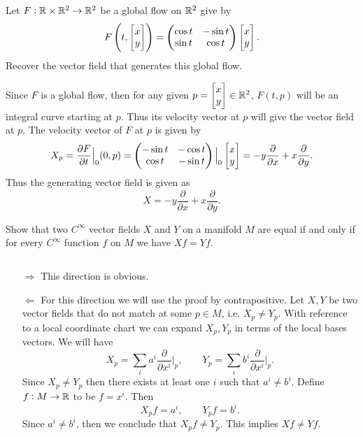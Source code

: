 \begin{problem}
	Let $ F: \mathbb{R}\times \mathbb{R}^2 \to \mathbb{R}^2 $ be a global flow on $ \mathbb{R}^2 $ give by
	\[ F\left( t, \begin{bmatrix} x \\ y \end{bmatrix} \right) = \begin{pmatrix} \cos t & -\sin t \\ \sin t & \cos t \end{pmatrix} \begin{bmatrix} x \\ y \end{bmatrix}. \]
	Recover the vector field that generates this global flow.
\end{problem}
\begin{solution}
	Since $ F $ is a global flow, then for any given $ p = \begin{bmatrix} x \\ y \end{bmatrix} \in \mathbb{R}^2 $, $ F(t,p) $ will be an integral curve starting at $ p $. Thus its velocity vector at $ p $ will give the vector field at $ p $. The velocity vector of $ F $ at $ p $ is given by
	\[ X_p = \frac{\partial F }{\partial t}\big|_{0}(0,p) = \begin{pmatrix} -\sin t & -\cos t \\ \cos t & -\sin t \end{pmatrix}\big|_{0} \begin{bmatrix} x \\ y \end{bmatrix} = -y\frac{\partial }{\partial x} + x \frac{\partial }{\partial y}. \]
	Thus the generating vector field is given as
	\[ X = -y \frac{\partial }{\partial x } + x \frac{\partial }{\partial y}. \]
\end{solution}

\begin{problem}
	Show that two $ C^\infty $ vector fields $ X $ and $ Y $ on a manifold $ M $ are equal if and only if for every $ C^\infty $ function $ f $ on $ M $ we have $ Xf = Yf $.
\end{problem}

\begin{solution}
	$ \ $
	\begin{itemize}
		\item[$\boxed{\Longrightarrow}$] This direction is obvious.
		\item[$\boxed{\Longleftarrow}$] For this direction we will use the proof by contrapositive. Let $ X, Y $ be two vector fields that do not match at some $ p \in M $, i.e. $ X_p \neq Y_p $. With reference to a local coordinate chart we can expand $ X_p, Y_p $ in terms of the local bases vectors. We will have
		\[ X_p = \sum_i a^i \frac{\partial}{\partial  x^i}\big|_{p}, \qquad Y_p = \sum_i b^i\frac{\partial}{\partial  x^i}\big|_{p}. \]
		Since $ X_p \neq Y_p $ then there exists at least one $ i $ such that $ a^i \neq b^i $. Define $ f:M \to \mathbb{R} $ to be $ f = x^i $. Then 
		\[ X_pf = a^i, \qquad Y_pf = b^i. \]
		Since $ a^i \neq b^i$, then we conclude that $ X_pf \neq Y_p $. This implies $ Xf \neq Yf $.
	\end{itemize}
\end{solution}


